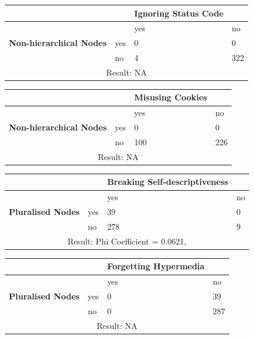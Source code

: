 \documentclass[a4paper,12pt]{article}
\begin{document}
\begin{center}
  \begin{tabular}{| p{60mm} | p{10mm} | p{35mm} | p{35mm} |}
  \hline
   & & \textbf{Ignoring Status Code} &
  \\
  \hline
  & & yes & no
  \\
  \hline
  \textbf{Non-hierarchical Nodes} & yes & 0 & 0
  \\
  \hline
   & no & 4 & 322
  \\
  \hline
  \multicolumn{4}{|c|}{Result: NA}
  \\ \hline
  \end{tabular}
  \end{center}

\begin{center}
  \begin{tabular}{| p{60mm} | p{10mm} | p{35mm} | p{35mm} |}
  \hline
   & & \textbf{Misusing Cookies} &
  \\
  \hline
  & & yes & no
  \\
  \hline
  \textbf{Non-hierarchical Nodes} & yes & 0 & 0
  \\
  \hline
   & no & 100 & 226
  \\
  \hline
  \multicolumn{4}{|c|}{Result: NA}
  \\ \hline
  \end{tabular}
  \end{center}

\begin{center}
  \begin{tabular}{| p{60mm} | p{10mm} | p{35mm} | p{35mm} |}
  \hline
   & & \textbf{Breaking Self-descriptiveness} &
  \\
  \hline
  & & yes & no
  \\
  \hline
  \textbf{Pluralised Nodes} & yes & 39 & 0
  \\
  \hline
   & no & 278 & 9
  \\
  \hline
  \multicolumn{4}{|c|}{Result: Phi Coefficient = 0.0621, }
  \\ \hline
  \end{tabular}
  \end{center}

\begin{center}
  \begin{tabular}{| p{60mm} | p{10mm} | p{35mm} | p{35mm} |}
  \hline
   & & \textbf{Forgetting Hypermedia} &
  \\
  \hline
  & & yes & no
  \\
  \hline
  \textbf{Pluralised Nodes} & yes & 0 & 39
  \\
  \hline
   & no & 0 & 287
  \\
  \hline
  \multicolumn{4}{|c|}{Result: NA}
  \\ \hline
  \end{tabular}
  \end{center}
\end{document}
